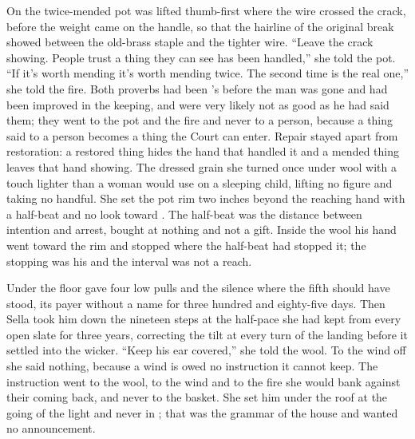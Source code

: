 On  the twice-mended pot was lifted thumb-first where the wire crossed the crack, before the weight came on the handle, so that the hairline of the original break showed between the old-brass staple and the tighter wire. “Leave the crack showing. People trust a thing they can see has been handled,” she told the pot. “If it's worth mending it's worth mending twice. The second time is the real one,” she told the fire. Both proverbs had been 's before the man was gone and had been improved in the keeping, and were very likely not as good as he had said them; they went to the pot and the fire and never to a person, because a thing said to a person becomes a thing the Court can enter. Repair stayed apart from restoration: a restored thing hides the hand that handled it and a mended thing leaves that hand showing. The dressed grain she turned once under wool with a touch lighter than a woman would use on a sleeping child, lifting no figure and taking no handful. She set the pot rim two inches beyond the reaching hand with a half-beat and no look toward . The half-beat was the distance between intention and arrest, bought at nothing and not a gift. Inside the wool his hand went toward the rim and stopped where the half-beat had stopped it; the stopping was his and the interval was not a reach.

Under the floor  gave four low pulls and the silence where the fifth should have stood, its payer without a name for three hundred and eighty-five days. Then Sella took him down the nineteen steps at the half-pace she had kept from every open slate for three years, correcting the tilt at every turn of the landing before it settled into the wicker. “Keep his ear covered,” she told the wool. To the wind off  she said nothing, because a wind is owed no instruction it cannot keep. The instruction went to the wool, to the wind and to the fire she would bank against their coming back, and never to the basket. She set him under the roof at the going of the light and never in ; that was the grammar of the house and wanted no announcement.

